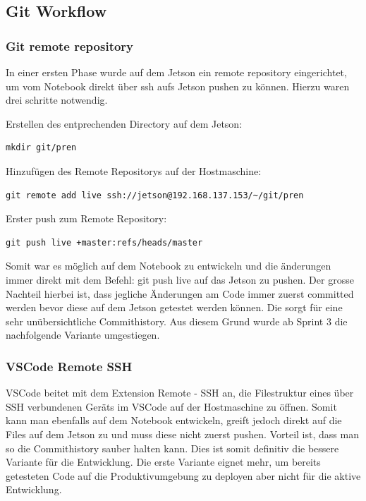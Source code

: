 \subsection{Git Workflow}
\subsubsection{Git remote repository}
In einer ersten Phase wurde auf dem Jetson ein remote repository eingerichtet, um vom Notebook direkt über ssh aufs Jetson pushen zu können. Hierzu waren drei schritte notwendig.

Erstellen des entprechenden Directory auf dem Jetson:
\begin{verbatim}
mkdir git/pren
\end{verbatim}


Hinzufügen des Remote Repositorys auf der Hostmaschine:
\begin{verbatim}
git remote add live ssh://jetson@192.168.137.153/~/git/pren
\end{verbatim}


Erster push zum Remote Repository:
\begin{verbatim}
git push live +master:refs/heads/master
\end{verbatim}


Somit war es möglich auf dem Notebook zu entwickeln und die änderungen immer direkt mit dem Befehl: git push live auf das Jetson zu pushen. Der grosse Nachteil hierbei ist, dass jegliche Änderungen am Code immer zuerst committed werden bevor diese auf dem Jetson getestet werden können. Die sorgt für eine sehr unübersichtliche Commithistory. Aus diesem Grund wurde ab Sprint 3 die nachfolgende Variante umgestiegen.

\subsubsection{VSCode Remote SSH}
VSCode beitet mit dem Extension Remote - SSH \cite{VSCode-Remote-SSH} an, die Filestruktur eines über SSH verbundenen Geräts im VSCode auf der Hostmaschine zu öffnen. Somit kann man ebenfalls auf dem Notebook entwickeln, greift jedoch direkt auf die Files auf dem Jetson zu und muss diese nicht zuerst pushen. Vorteil ist, dass man so die Commithistory sauber halten kann. Dies ist somit definitiv die bessere Variante für die Entwicklung. Die erste Variante eignet mehr, um bereits getesteten Code auf die Produktivumgebung zu deployen aber nicht für die aktive Entwicklung.





  